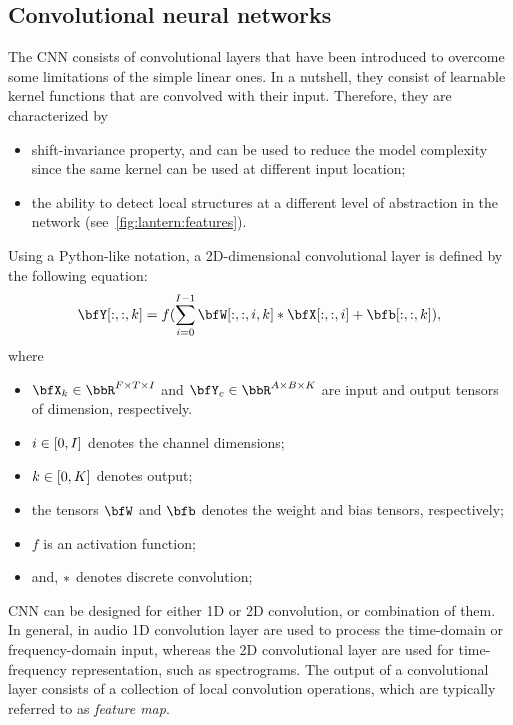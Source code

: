 \subsection{Convolutional neural networks}\label{subsec:lantern:cnn}
The \ac{CNN} consists of convolutional layers that have been introduced to overcome some limitations of the simple linear ones.
In a nutshell, they consist of learnable kernel functions that are convolved with their input.
Therefore, they are characterized by
\begin{itemize}
    \item shift-invariance property, and can be used to reduce the model complexity since the same kernel can be used at different input location;
    \item the ability to detect local structures at a different level of abstraction in the network (see~\cref{fig:lantern:features}).
\end{itemize}
Using a Python-like notation, a 2D-dimensional convolutional layer is defined by the following equation:
\begin{equation*}
    \bfY[:,:,k] = f( \sum_{i=0}^{I-1} \bfW[:,:,i,k] \convDis \bfX[:,:,i] + \bfb[:,:,k])
    ,
\end{equation*}
where
\begin{itemize}
    \item $\bfX_k\in\bbR^{F \times T \times I}$ and $\bfY_c\in\bbR^{A \times B \times K}$ are input and output tensors of dimension, respectively.
    \item $i\in\klist{0,I}$ denotes the channel dimensions;
    \item $k\in\klist{0,K}$ denotes output;
    \item the tensors $\bfW$ and $\bfb$ denotes the weight and bias tensors, respectively;
    \item $f$ is an activation function;
    \item and, $\ast$ denotes discrete convolution;
\end{itemize}
\ac{CNN} can be designed for either 1D or 2D convolution, or combination of them.
In general, in audio 1D convolution layer are used to process the time-domain or frequency-domain input, whereas the 2D convolutional layer are used for time-frequency representation, such as spectrograms.
The output of a convolutional layer consists of a collection of local convolution operations, which are typically referred to as \textit{feature map}.
